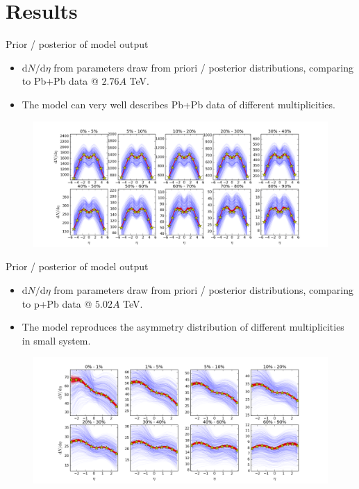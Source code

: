 \documentclass[11pt]{beamer}
\begin{document}

\section{Results}
\begin{frame}{Prior / posterior of model output}
\begin{itemize}
\item $\mathrm{d}N/\mathrm{d}\eta$ from parameters draw from priori / posterior distributions, comparing to Pb+Pb data @ $2.76A$ TeV. 
\item The model can very well describes Pb+Pb data of different multiplicities.
\end{itemize}
\begin{figure}
\begin{center}
\includegraphics[width = \textwidth]{./pics/pri-post-PbPb.png}
\end{center}
\end{figure}
\end{frame}

\begin{frame}{Prior / posterior of model output}
\begin{itemize}
\item $\mathrm{d}N/\mathrm{d}\eta$ from parameters draw from priori / posterior distributions, comparing to p+Pb data @ $5.02A$ TeV. 
\item The model reproduces the asymmetry distribution of different multiplicities in small system.
\end{itemize}
\begin{figure}
\begin{center}
\includegraphics[width = \textwidth]{./pics/pri-post-pPb.png}
\end{center}
\end{figure}
\end{frame}
\end{document}
